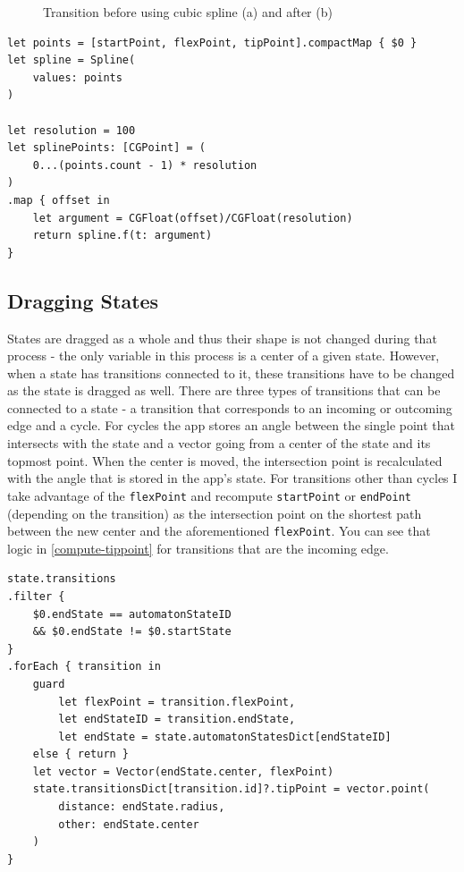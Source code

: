 \begin{figure}
    \centering
    \caption{Transition before using cubic spline (a) and after (b)}\label{spline}
\end{figure}

\begin{lstlisting}[caption={Creating spline points}, label=spline-code]
let points = [startPoint, flexPoint, tipPoint].compactMap { $0 }
let spline = Spline(
    values: points
)

let resolution = 100
let splinePoints: [CGPoint] = (
    0...(points.count - 1) * resolution
)
.map { offset in
    let argument = CGFloat(offset)/CGFloat(resolution)
    return spline.f(t: argument)
}
\end{lstlisting}

\subsection{Dragging States}

States are dragged as a whole and thus their shape is not changed during that process - the only variable in this process is a center of a given state. However, when a state has transitions connected to it, these transitions have to be changed as the state is dragged as well. There are three types of transitions that can be connected to a state - a transition that corresponds to an incoming or outcoming edge and a cycle. For cycles the app stores an angle between the single point that intersects with the state and a vector going from a center of the state and its topmost point. When the center is moved, the intersection point is recalculated with the angle that is stored in the app's state. For transitions other than cycles I take advantage of the \lstinline{flexPoint} and recompute \lstinline{startPoint} or \lstinline{endPoint} (depending on the transition) as the intersection point on the shortest path between the new center and the aforementioned \lstinline{flexPoint}. You can see that logic in \ref{compute-tippoint} for transitions that are the incoming edge.

\begin{lstlisting}[caption={Calculation of new \lstinline{tipPoint}}, label=compute-tippoint]
state.transitions
.filter { 
    $0.endState == automatonStateID 
    && $0.endState != $0.startState 
}
.forEach { transition in
    guard
        let flexPoint = transition.flexPoint,
        let endStateID = transition.endState,
        let endState = state.automatonStatesDict[endStateID]
    else { return }
    let vector = Vector(endState.center, flexPoint)
    state.transitionsDict[transition.id]?.tipPoint = vector.point(
        distance: endState.radius, 
        other: endState.center
    )
}
\end{lstlisting}
 
